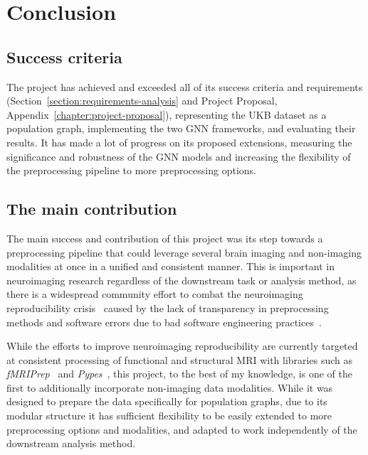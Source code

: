 \chapter{Conclusion}



\section{Success criteria}
The project has achieved and exceeded all of its success criteria and requirements (Section~\ref{section:requirements-analysis} and Project Proposal, Appendix~\ref{chapter:project-proposal}), representing the UKB dataset as a population graph, implementing the two GNN frameworks, and evaluating their results. It has made a lot of progress on its proposed extensions, measuring the significance and robustness of the GNN models and increasing the flexibility of the preprocessing pipeline to more preprocessing options.

\section{The main contribution}
The main success and contribution of this project was its step towards a preprocessing pipeline that could leverage several brain imaging and non-imaging modalities at once in a unified and consistent manner. This is important in neuroimaging research regardless of the downstream task or analysis method, as there is a widespread community effort to combat the neuroimaging reproducibility crisis~\cite{gorgolewski2016practical} caused by the lack of transparency in preprocessing methods and software errors due to bad software engineering practices~\cite{poldrack2017scanning}.

While the efforts to improve neuroimaging reproducibility are currently targeted at consistent processing of functional and structural MRI with libraries such as \textit{fMRIPrep}~\cite{esteban2019fmriprep} and \textit{Pypes}~\cite{savio2017pypes}, this project, to the best of my knowledge, is one of the first to additionally incorporate non-imaging data modalities. While it was designed to prepare the data specifically for population graphs, due to its modular structure it has sufficient flexibility to be easily extended to more preprocessing options and modalities, and adapted to work independently of the downstream analysis method.

